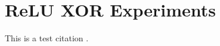\chapter{ReLU XOR Experiments}

This is a test citation \cite{fake2025}.

\printbibliography[heading=subbibliography]
